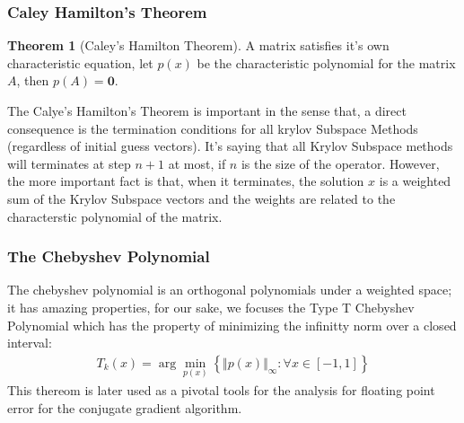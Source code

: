 \documentclass[]{article}
\theoremstyle{definition}
\newtheorem{theorem}{Theorem}            %
\begin{document}
        \subsubsection{Caley Hamilton's Theorem}
            \begin{theorem}[Caley's Hamilton Theorem]\label{theorem:Caley_Hamilton}
                A matrix satisfies it's own characteristic equation, let $p(x)$ be the characteristic polynomial for the matrix $A$, then $p(A) = \mathbf 0$. 
            \end{theorem}
            The Calye's Hamilton's Theorem is important in the sense that, a direct consequence is the termination conditions for all krylov Subspace Methods (regardless of initial guess vectors). It's saying that all Krylov Subspace methods will terminates at step $n + 1$ at most, if $n$ is the size of the operator. However, the more important fact is that, when it terminates, the solution $x$ is a weighted sum of the Krylov Subspace vectors and the weights are related to the characterstic polynomial of the matrix. 
        \subsubsection{The Chebyshev Polynomial}
            The chebyshev polynomial is an orthogonal polynomials under a weighted space; it has amazing properties, for our sake, we focuses the Type T Chebyshev Polynomial which has the property of minimizing the infinitty norm over a closed interval: 
            \begin{align}
                T_k(x) = \arg\min_{p(x)}
                \left\lbrace
                    \Vert p(x) \Vert_\infty: \forall x \in [-1, 1]
                \right\rbrace
            \end{align}
            This thereom is later used as a pivotal tools for the analysis for floating point error for the conjugate gradient algorithm. 
\end{document}
